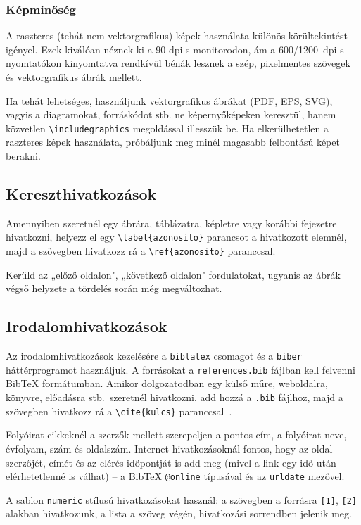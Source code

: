 \documentclass{sapientia-thesis}
\begin{document}
\subsubsection{Képminőség}
A raszteres (tehát nem vektorgrafikus) képek használata különös körültekintést igényel. Ezek kiválóan néznek ki a 90 dpi-s monitorodon, ám a 600/1200~dpi-s nyomtatókon kinyomtatva rendkívül bénák lesznek a szép, pixelmentes szövegek és vektorgrafikus ábrák mellett.

Ha tehát lehetséges, használjunk vektorgrafikus ábrákat (PDF, EPS, SVG), vagyis a diagramokat, forráskódot stb. ne képernyőképeken keresztül, hanem közvetlen \verb|\includegraphics| megoldással illesszük be. Ha elkerülhetetlen a raszteres képek használata, próbáljunk meg minél magasabb felbontású képet berakni.

\subsection{Kereszthivatkozások}
Amennyiben szeretnél egy ábrára, táblázatra, képletre vagy korábbi fejezetre hivatkozni, helyezz el egy \verb|\label{azonosito}| parancsot a hivatkozott elemnél, majd a szövegben hivatkozz rá a \verb|\ref{azonosito}| paranccsal.

Kerüld az „előző oldalon", „következő oldalon" fordulatokat, ugyanis az ábrák végső helyzete a tördelés során még megváltozhat.

\subsection{Irodalomhivatkozások}
Az irodalomhivatkozások kezelésére a \texttt{biblatex} csomagot és a \texttt{biber} háttérprogramot használjuk. A forrásokat a \texttt{references.bib} fájlban kell felvenni BibTeX formátumban. Amikor dolgozatodban egy külső műre, weboldalra, könyvre, előadásra stb.\ szeretnél hivatkozni, add hozzá a \texttt{.bib} fájlhoz, majd a szövegben hivatkozz rá a \verb|\cite{kulcs}| paranccsal~\cite{piczak2015esc, bosch2012irmas}.

Folyóirat cikkeknél a szerzők mellett szerepeljen a pontos cím, a folyóirat neve, évfolyam, szám és oldalszám. Internet hivatkozásoknál fontos, hogy az oldal szerzőjét, címét és az elérés időpontját is add meg (mivel a link egy idő után elérhetetlenné is válhat) -- a BibTeX \texttt{@online} típusával és az \texttt{urldate} mezővel.

A sablon \texttt{numeric} stílusú hivatkozásokat használ: a szövegben a forrásra \texttt{[1]}, \texttt{[2]} alakban hivatkozunk, a lista a szöveg végén, hivatkozási sorrendben jelenik meg.
\end{document}
